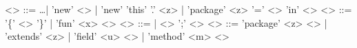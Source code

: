 \documentclass[preview]{standalone}
\begin{document}
\begin{displaygrammar}
<\coree> ::= \ldots | 'new' <\pkg> | 'new' 'this' '.' <z> | 'package' <z> '=' <\pkg> 'in' <\coree> 
<\pkg> ::= '\{' <\pkgdefs> '\}' | 'fun' <x> <\pkg>
<\pkgdefs> ::= \emptyset | <\pkgdef> ';' <\pkgdefs> 
<\pkgdef> ::= 'package' <z> \eqN <\pkg> | 'extends' <z> | 'field' <u> \eqN <\coree> | 'method' <m> \eqN <\coree> 
\end{displaygrammar}
\end{document}
